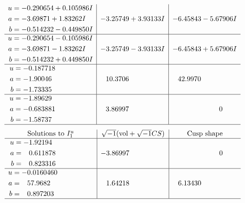 \documentclass[1p]{elsarticle_modified}
\theoremstyle{definition}
\newcommand{\I}{\sqrt{-1}}
\begin{document}
$$\begin{array}{c|c|c}
\begin{aligned}
u &= -0.290654 + 0.105986 I \\
a &= -3.69871 + 1.83262 I \\
b &= -0.514232 - 0.449850 I\end{aligned}
 & -3.25749 + 3.93133 I & -6.45843 - 5.67906 I \\ \hline\begin{aligned}
u &= -0.290654 - 0.105986 I \\
a &= -3.69871 - 1.83262 I \\
b &= -0.514232 + 0.449850 I\end{aligned}
 & -3.25749 - 3.93133 I & -6.45843 + 5.67906 I \\ \hline\begin{aligned}
u &= -0.187718\phantom{ +0.000000I} \\
a &= -1.90046\phantom{ +0.000000I} \\
b &= -1.73335\phantom{ +0.000000I}\end{aligned}
 & \phantom{-}10.3706\phantom{ +0.000000I} & \phantom{-}42.9970\phantom{ +0.000000I} \\ \hline\begin{aligned}
u &= -1.89629\phantom{ +0.000000I} \\
a &= -0.683881\phantom{ +0.000000I} \\
b &= -1.58737\phantom{ +0.000000I}\end{aligned}
 & \phantom{-}3.86997\phantom{ +0.000000I} & \phantom{-0.000000 } 0\\
 \hline 
 \end{array}$$\newpage$$\begin{array}{c|c|c}  
\text{Solutions to }I^u_{1}& \I (\text{vol} + \sqrt{-1}CS) & \text{Cusp shape}\\
 \hline 
\begin{aligned}
u &= -1.92194\phantom{ +0.000000I} \\
a &= \phantom{-}0.611878\phantom{ +0.000000I} \\
b &= \phantom{-}0.823316\phantom{ +0.000000I}\end{aligned}
 & -3.86997\phantom{ +0.000000I} & \phantom{-0.000000 } 0 \\ \hline\begin{aligned}
u &= -0.0160460\phantom{ +0.000000I} \\
a &= \phantom{-}57.9682\phantom{ +0.000000I} \\
b &= \phantom{-}0.897203\phantom{ +0.000000I}\end{aligned}
 & \phantom{-}1.64218\phantom{ +0.000000I} & \phantom{-}6.13430\phantom{ +0.000000I}\\
 \hline 
 \end{array}$$\newpage\newpage\renewcommand{\arraystretch}{1}
\end{document}

